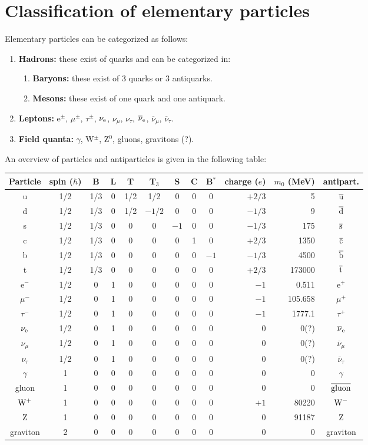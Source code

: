 \section[~~Classification of elementary particles]{Classification of elementary particles}
Elementary particles can be categorized as follows:
\begin{enumerate}
\item {\bf Hadrons:} these exist of quarks and can be categorized in:
      \begin{enumerate}
      \item {\bf Baryons:} these exist of 3 quarks or 3 antiquarks.
      \item {\bf Mesons:} these exist of one quark and one antiquark.
      \end{enumerate}
\item {\bf Leptons:} e$^\pm$, $\mu^\pm$, $\tau^\pm$, $\nu_{\rm e}$, $\nu_\mu$, $\nu_\tau$,
      $\overline{\nu}_{\rm e}$, $\overline{\nu}_\mu$, $\overline{\nu}_\tau$.
\item {\bf Field quanta:} $\gamma$, W$^\pm$, Z$^0$, gluons, gravitons (?).
\end{enumerate}
An overview of particles and antiparticles is given in the following table:
\begin{center}
\begin{tabular}{||c|c@{}cccccccrr|c||}
\hline
Particle&spin ($\hbar$)&B&L&T&T$_3$&S&C&B$^*$&charge ($e$)&$m_0$ (MeV)&antipart.\\
\hline
\hline
u&1/2&1/3&0&1/2&1/2   &0 &0 &0   &$+2/3$&     5&$\overline{\rm u}$\\
d&1/2&1/3&0&1/2&$-1/2$&0 &0 &0   &$-1/3$&     9&$\overline{\rm d}$\\
s&1/2&1/3&0&0  &0   &$-1$&0 &0   &$-1/3$&   175&$\overline{\rm s}$\\
c&1/2&1/3&0&0  &0     &0 &1 &0   &$+2/3$&  1350&$\overline{\rm c}$\\
b&1/2&1/3&0&0  &0     &0 &0 &$-1$&$-1/3$&  4500&$\overline{\rm b}$\\
t&1/2&1/3&0&0  &0     &0 &0 &0   &$+2/3$&173000&$\overline{\rm t}$\\
\hline
e$^-$        &1/2&0&1&0&0&0&0&0&$-1$&   0.511&e$^+$\\
$\mu^-$      &1/2&0&1&0&0&0&0&0&$-1$& 105.658&$\mu^+$\\
$\tau^-$     &1/2&0&1&0&0&0&0&0&$-1$&1777.1  &$\tau^+$\\
$\nu_{\rm e}$&1/2&0&1&0&0&0&0&0& 0  &    0(?)&$\overline{\nu}_{\rm e}$\\
$\nu_\mu$    &1/2&0&1&0&0&0&0&0& 0  &    0(?)&$\overline{\nu}_{\mu}$\\
$\nu_\tau$   &1/2&0&1&0&0&0&0&0& 0  &    0(?)&$\overline{\nu}_{\tau}$\\
\hline
$\gamma$ &1&0&0&0&0&0&0&0&$0$&0&$\gamma$\\
gluon    &1&0&0&0&0&0&0&0&$0$&0&$\overline{\rm gluon}$\\
$\rm W^+$&1&0&0&0&0&0&0&0&$+1$&80220&$\rm W^-$\\
Z        &1&0&0&0&0&0&0&0&$0$&91187&Z\\
graviton &2&0&0&0&0&0&0&0&$0$&0&graviton\\
\hline
\end{tabular}
\end{center}
